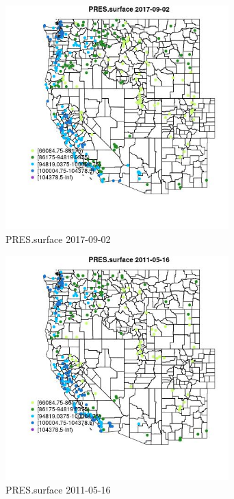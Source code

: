 \begin{figure} 
\centering  
\includegraphics[width=0.77\textwidth]{Code_Outputs/Report_ML_input_PM25_Step4_part_e_de_duplicated_aves_compiled_2019-05-21wNAs_MapObsPRESsurface2017-09-02.jpg} 
\caption{\label{fig:Report_ML_input_PM25_Step4_part_e_de_duplicated_aves_compiled_2019-05-21wNAsMapObsPRESsurface2017-09-02}PRES.surface 2017-09-02} 
\end{figure} 
 

\begin{figure} 
\centering  
\includegraphics[width=0.77\textwidth]{Code_Outputs/Report_ML_input_PM25_Step4_part_e_de_duplicated_aves_compiled_2019-05-21wNAs_MapObsPRESsurface2011-05-16.jpg} 
\caption{\label{fig:Report_ML_input_PM25_Step4_part_e_de_duplicated_aves_compiled_2019-05-21wNAsMapObsPRESsurface2011-05-16}PRES.surface 2011-05-16} 
\end{figure} 
 

